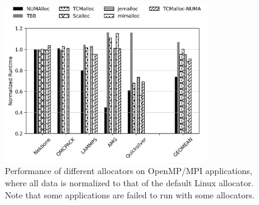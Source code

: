 
 \begin{figure}[!h]
    \centering
    \includegraphics[width=3.5in]{figure/8-node-mpi-perf.jpg}
    \caption{Performance of different allocators on OpenMP/MPI applications, where all data is normalized to that of the default Linux allocator. Note that some applications are failed to run with some allocators.
    \label{fig:perf2}}
 \end{figure}


